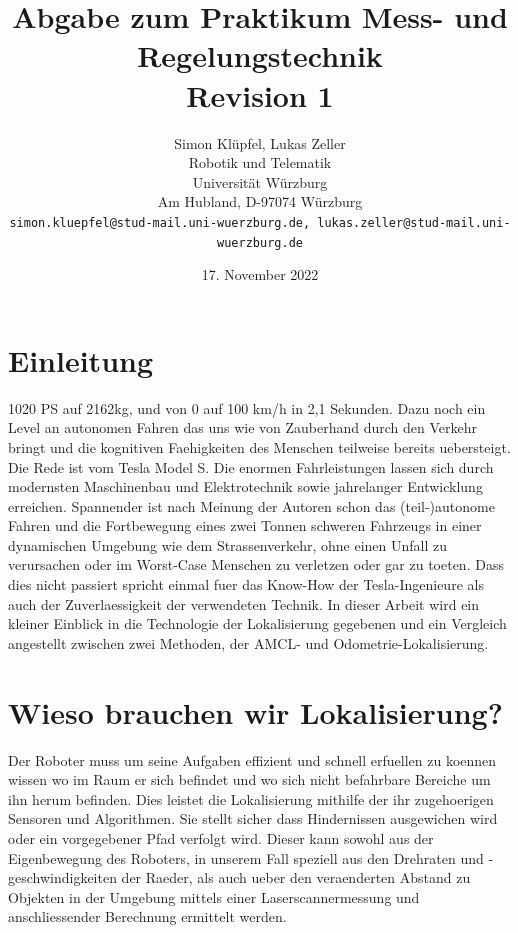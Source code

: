 \documentclass[11pt,a4paper]{article}
\begin{document}
\title{\Large\bf Abgabe zum Praktikum Mess- und Regelungstechnik \\ \textbf{Revision 1}}

\author{Simon Klüpfel, Lukas Zeller\\
  Robotik und Telematik \\
  Universität Würzburg\\
  Am Hubland, D-97074 Würzburg\\
{\small \texttt{simon.kluepfel@stud-mail.uni-wuerzburg.de, lukas.zeller@stud-mail.uni-wuerzburg.de}}
}
\date{17. November 2022}

\maketitle

\section{Einleitung}
1020 PS auf 2162kg, und von 0 auf 100 km/h in 2,1 Sekunden\cite{website:tesla}. Dazu noch ein Level an autonomen Fahren das uns wie von Zauberhand durch den Verkehr bringt
und die kognitiven Faehigkeiten des Menschen teilweise bereits uebersteigt. Die Rede ist vom Tesla Model S. Die enormen Fahrleistungen lassen sich durch modernsten Maschinenbau und Elektrotechnik 
sowie jahrelanger Entwicklung erreichen. Spannender ist nach Meinung der Autoren schon das (teil-)autonome Fahren und die Fortbewegung eines 
zwei Tonnen schweren Fahrzeugs in einer dynamischen Umgebung wie dem Strassenverkehr, ohne einen Unfall zu verursachen oder im Worst-Case Menschen zu verletzen oder gar zu toeten.
Dass dies nicht passiert spricht einmal fuer das Know-How der Tesla-Ingenieure als auch der Zuverlaessigkeit der verwendeten Technik. In dieser Arbeit wird 
ein kleiner Einblick in die Technologie der Lokalisierung gegebenen und ein Vergleich angestellt zwischen zwei Methoden, der AMCL- und Odometrie-Lokalisierung.

\section{Wieso brauchen wir Lokalisierung?}
Der Roboter muss um seine Aufgaben effizient und schnell erfuellen zu koennen wissen wo im Raum er sich befindet und wo sich nicht befahrbare Bereiche um ihn herum befinden.
Dies leistet die Lokalisierung mithilfe der ihr zugehoerigen Sensoren und Algorithmen. Sie stellt sicher dass Hindernissen ausgewichen wird oder ein vorgegebener Pfad verfolgt wird. 
Dieser kann sowohl aus der Eigenbewegung des Roboters, in unserem Fall speziell aus den Drehraten und -geschwindigkeiten der Raeder, als auch ueber den veraenderten Abstand zu Objekten 
in der Umgebung mittels einer Laserscannermessung und anschliessender Berechnung ermittelt werden. 
\end{document}
